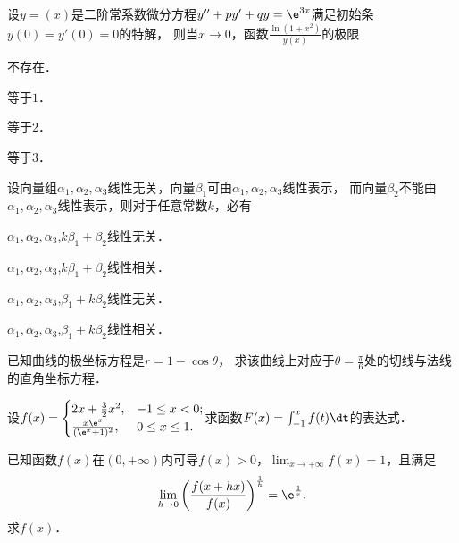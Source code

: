 \documentclass[plain,noanswer,medmath]{../../template/jnuexam}
\begin{document}
\begin{problem}
设$y = (x)$是二阶常系数微分方程$y'' + py' + qy = \e^{3x}$满足初始条$y(0) = y'(0) = 0$的特解，
则当$x \to 0$，函数$\frac{\ln(1 + x^2)}{y(x)}$的极限\pickout{}
\begin{abcd}
\item 不存在．
\item 等于$1$．
\item 等于$2$．
\item 等于$3$．
\end{abcd}
\end{problem}




\begin{problem}
设向量组$\alpha_1,\alpha_2,\alpha_3$线性无关，向量$\beta_1$可由$\alpha_1,\alpha_2,\alpha_3$线性表示，
而向量$\beta_2$不能由$\alpha_1,\alpha_2,\alpha_3$线性表示，则对于任意常数$k$，必有\pickout{}
\begin{abcd}
\item $\alpha_1,\alpha_2,\alpha_3$,$k\beta_1 + \beta_2$线性无关．
\item $\alpha_1,\alpha_2,\alpha_3$,$k\beta_1 + \beta_2$线性相关．
\item $\alpha_1,\alpha_2,\alpha_3$,$\beta_1 + k\beta_2$线性无关．
\item $\alpha_1,\alpha_2,\alpha_3$,$\beta_1 + k\beta_2$线性相关．
\end{abcd}
\end{problem}



\begin{problem}
已知曲线的极坐标方程是$r = 1 - \cos\theta$，
求该曲线上对应于$\theta = \frac{\pi}{6}$处的切线与法线的直角坐标方程．
\end{problem}



\begin{problem}
设$f(x) = \begin{cases}
         2x + \frac{3}{2}x^2, & -1 \le x < 0; \\
  \frac{x\e^x}{(\e^x + 1)^2}, & 0 \le x \le 1.
\end{cases}$求函数$F(x) = \int_{-1}^x f(t)\dt$的表达式．
\end{problem}



\begin{problem}
已知函数$f(x)$在$(0, +\infty)$内可导$f(x) > 0$，$\lim_{x \to +\infty} f(x) = 1$，且满足
$$\lim_{h \to 0} \left(\frac{f(x + hx)}{f(x)} \right)^{\frac{1}{h}} = \e^{\frac{1}{x}},$$
求$f(x)$．
\end{problem}
\end{document}
